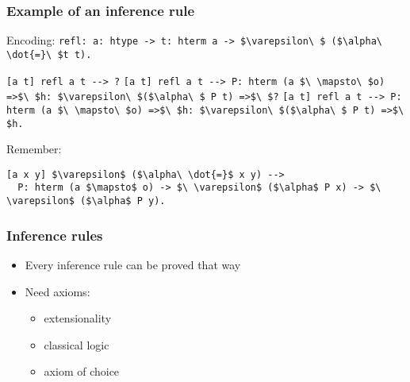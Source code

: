 \begin{frame}[fragile]
\frametitle{Example of an inference rule}

\begin{mathpar}
\end{mathpar}

\begin{block}{Encoding:}
\lstinline!refl: a: htype -> t: hterm a -> $\varepsilon\ $ ($\alpha\ \dot{=}\ $t t).!

\begin{overprint}
\lstinline![a t] refl a t --> ?!
\lstinline![a t] refl a t --> P: hterm (a $\ \mapsto\ $o) =>$\ $h: $\varepsilon\ $($\alpha\ $ P t) =>$\ $?!
\lstinline![a t] refl a t --> P: hterm (a $\ \mapsto\ $o) =>$\ $h: $\varepsilon\ $($\alpha\ $ P t) =>$\ $h.!
\end{overprint}
\end{block}

\begin{block}{Remember:}
\begin{lstlisting}
[a x y] $\varepsilon$ ($\alpha\ \dot{=}$ x y) -->
  P: hterm (a $\mapsto$ o) -> $\ \varepsilon$ ($\alpha$ P x) -> $\ \varepsilon$ ($\alpha$ P y).
\end{lstlisting}
\end{block}

\end{frame}


\begin{frame}
\frametitle{Inference rules}

\begin{itemize}
\item Every inference rule can be proved that way
\item Need axioms:
  \begin{itemize}
  \item extensionality
  \item classical logic
  \item axiom of choice
  \end{itemize}
\end{itemize}

\end{frame}
